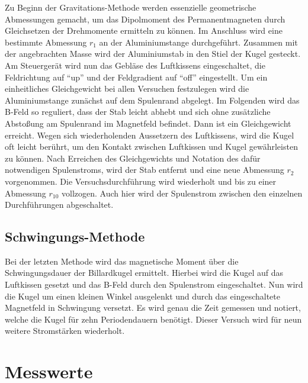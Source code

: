 \noindent Zu Beginn der Gravitations-Methode werden essenzielle geometrische Abmessungen gemacht, um das Dipolmoment des 
Permanentmagneten durch Gleichsetzen der Drehmomente ermitteln zu können. Im Anschluss wird eine bestimmte Abmessung $r_1$ 
an der Aluminiumstange durchgeführt. Zusammen mit der angebrachten Masse wird der Aluminiumstab in den Stiel der Kugel gesteckt. 
Am Steuergerät wird nun das Gebläse des Luftkissens eingeschaltet, die Feldrichtung auf \enquote{up} und der Feldgradient auf 
\enquote{off} eingestellt. Um ein einheitliches Gleichgewicht bei allen Versuchen festzulegen wird die Aluminiumstange zunächst auf 
dem Spulenrand abgelegt. Im Folgenden wird das B-Feld so reguliert, dass der Stab leicht abhebt und sich ohne zusätzliche 
Abstoßung am Spulenrand im Magnetfeld befindet. Dann ist ein Gleichgewicht erreicht. Wegen sich wiederholenden Aussetzern des 
Luftkissens, wird die Kugel oft leicht berührt, um den Kontakt zwischen Luftkissen und Kugel gewährleisten zu können.
Nach Erreichen des Gleichgewichts und Notation des dafür notwendigen Spulenstroms, wird der Stab entfernt und eine neue Abmessung 
$r_2$ vorgenommen. Die Versuchsdurchführung wird wiederholt und bis zu einer Abmessung $r_10$ vollzogen. Auch hier wird der 
Spulenstrom zwischen den einzelnen Durchführungen abgeschaltet.

\subsection{Schwingungs-Methode}

\noindent Bei der letzten Methode wird das magnetische Moment über die Schwingungsdauer der Billardkugel ermittelt. Hierbei wird
die Kugel auf das Luftkissen gesetzt und das B-Feld durch den Spulenstrom eingeschaltet. Nun wird die Kugel um einen kleinen Winkel 
ausgelenkt und durch das eingeschaltete Magnetfeld in Schwingung versetzt. Es wird genau die Zeit gemessen und notiert, welche 
die Kugel für zehn Periodendauern benötigt. Dieser Versuch wird für neun weitere Stromstärken wiederholt.

\section{Messwerte}



